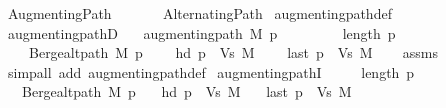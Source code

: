 %
\begin{isabellebody}%
%
%
\isadelimtheory
%
\endisadelimtheory
%
\isatagtheory
{}\isamarkupfalse%
\ Augmenting{\isacharunderscore}{\kern0pt}Path\isanewline
\ \ \isanewline
\ \ \ \ Alternating{\isacharunderscore}{\kern0pt}Path\isanewline
{}%
\endisatagtheory
{\isafoldtheory}%
%
\isadelimtheory
\isanewline
%
\endisadelimtheory
%
\isadeliminvisible
\isanewline
%
\endisadeliminvisible
%
\isataginvisible
{}\isamarkupfalse%
\ augmenting{\isacharunderscore}{\kern0pt}path{\isacharunderscore}{\kern0pt}def\isanewline
{}\isamarkupfalse%
\ augmenting{\isacharunderscore}{\kern0pt}pathD{\isacharcolon}{\kern0pt}\isanewline
\ \ \ {\isachardoublequoteopen}augmenting{\isacharunderscore}{\kern0pt}path\ M\ p{\isachardoublequoteclose}\isanewline
\ \ \isanewline
\ \ \ \ {\isachardoublequoteopen}{}\ {\isasymle}\ length\ p{\isachardoublequoteclose}\isanewline
\ \ \ \ {\isachardoublequoteopen}Berge{\isachardot}{\kern0pt}alt{\isacharunderscore}{\kern0pt}path\ M\ p{\isachardoublequoteclose}\isanewline
\ \ \ \ {\isachardoublequoteopen}hd\ p\ {\isasymnotin}\ Vs\ M{\isachardoublequoteclose}\isanewline
\ \ \ \ {\isachardoublequoteopen}last\ p\ {\isasymnotin}\ Vs\ M{\isachardoublequoteclose}%
\endisataginvisible
{\isafoldinvisible}%
%
\isadeliminvisible
\isanewline
%
\endisadeliminvisible
%
\isadelimproof
\ \ %
\endisadelimproof
%
\isatagproof
{}\isamarkupfalse%
\ assms\isanewline
\ \ \isamarkupfalse%
\ {\isacharparenleft}{\kern0pt}simp{\isacharunderscore}{\kern0pt}all\ add{\isacharcolon}{\kern0pt}\ augmenting{\isacharunderscore}{\kern0pt}path{\isacharunderscore}{\kern0pt}def{\isacharparenright}{\kern0pt}%
\endisatagproof
{\isafoldproof}%
%
\isadelimproof
\isanewline
%
\endisadelimproof
%
\isadeliminvisible
\isanewline
%
\endisadeliminvisible
%
\isataginvisible
{}\isamarkupfalse%
\ augmenting{\isacharunderscore}{\kern0pt}pathI{\isacharcolon}{\kern0pt}\isanewline
\ \ \ {\isachardoublequoteopen}{}\ {\isasymle}\ length\ p{\isachardoublequoteclose}\isanewline
\ \ \ {\isachardoublequoteopen}Berge{\isachardot}{\kern0pt}alt{\isacharunderscore}{\kern0pt}path\ M\ p{\isachardoublequoteclose}\isanewline
\ \ \ {\isachardoublequoteopen}hd\ p\ {\isasymnotin}\ Vs\ M{\isachardoublequoteclose}\isanewline
\ \ \ {\isachardoublequoteopen}last\ p\ {\isasymnotin}\ Vs\ M{\isachardoublequoteclose}\isanewline

\end{isabellebody}
